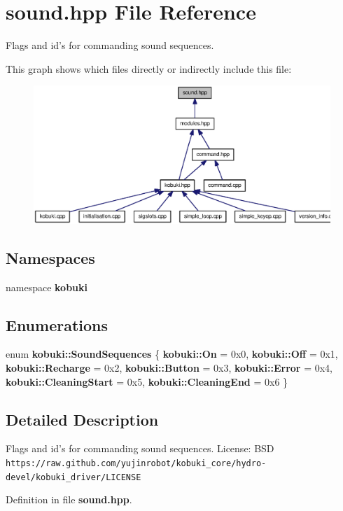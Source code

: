 \section{sound.\-hpp \-File \-Reference}
\label{sound_8hpp}


\-Flags and id's for commanding sound sequences.  


\-This graph shows which files directly or indirectly include this file\-:
\nopagebreak
\begin{figure}[H]
\begin{center}
\leavevmode
\includegraphics[width=350pt]{sound_8hpp__dep__incl}
\end{center}
\end{figure}
\subsection*{\-Namespaces}
\begin{DoxyCompactItemize}
\item 
namespace {\bf kobuki}
\end{DoxyCompactItemize}
\subsection*{\-Enumerations}
\begin{DoxyCompactItemize}
\item 
enum {\bf kobuki\-::\-Sound\-Sequences} \{ \*
{\bf kobuki\-::\-On} =  0x0, 
{\bf kobuki\-::\-Off} =  0x1, 
{\bf kobuki\-::\-Recharge} =  0x2, 
{\bf kobuki\-::\-Button} =  0x3, 
\*
{\bf kobuki\-::\-Error} =  0x4, 
{\bf kobuki\-::\-Cleaning\-Start} =  0x5, 
{\bf kobuki\-::\-Cleaning\-End} =  0x6
 \}
\end{DoxyCompactItemize}


\subsection{\-Detailed \-Description}
\-Flags and id's for commanding sound sequences. \-License\-: \-B\-S\-D {\tt https\-://raw.\-github.\-com/yujinrobot/kobuki\-\_\-core/hydro-\/devel/kobuki\-\_\-driver/\-L\-I\-C\-E\-N\-S\-E} 

\-Definition in file {\bf sound.\-hpp}.

